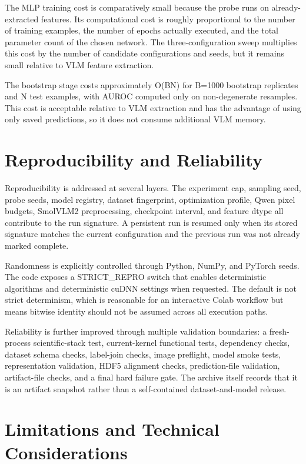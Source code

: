 \documentclass[11pt,a4paper]{article}
\begin{document}
The MLP training cost is comparatively small because the probe runs on already-extracted features. Its computational cost is roughly proportional to the number of training examples, the number of epochs actually executed, and the total parameter count of the chosen network. The three-configuration sweep multiplies this cost by the number of candidate configurations and seeds, but it remains small relative to VLM feature extraction.

The bootstrap stage costs approximately O(BN) for B=1000 bootstrap replicates and N test examples, with AUROC computed only on non-degenerate resamples. This cost is acceptable relative to VLM extraction and has the advantage of using only saved predictions, so it does not consume additional VLM memory.

\section{Reproducibility and Reliability}

Reproducibility is addressed at several layers. The experiment cap, sampling seed, probe seeds, model registry, dataset fingerprint, optimization profile, Qwen pixel budgets, SmolVLM2 preprocessing, checkpoint interval, and feature dtype all contribute to the run signature. A persistent run is resumed only when its stored signature matches the current configuration and the previous run was not already marked complete.

Randomness is explicitly controlled through Python, NumPy, and PyTorch seeds. The code exposes a STRICT\_REPRO switch that enables deterministic algorithms and deterministic cuDNN settings when requested. The default is not strict determinism, which is reasonable for an interactive Colab workflow but means bitwise identity should not be assumed across all execution paths.

Reliability is further improved through multiple validation boundaries: a fresh-process scientific-stack test, current-kernel functional tests, dependency checks, dataset schema checks, label-join checks, image preflight, model smoke tests, representation validation, HDF5 alignment checks, prediction-file validation, artifact-file checks, and a final hard failure gate. The archive itself records that it is an artifact snapshot rather than a self-contained dataset-and-model release.

\section{Limitations and Technical Considerations}
\end{document}
